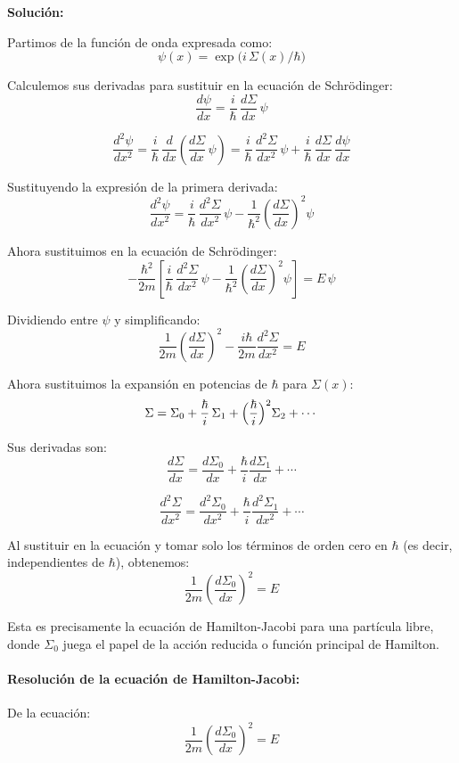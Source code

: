 \documentclass[12pt]{article}
\begin{document}
\begin{enumerate}
  \textbf{Solución:}

  Partimos de la función de onda expresada como:
  \[
    \psi(x) = \exp\!\bigl(i\,\Sigma(x)/\hbar\bigr)
  \]

  Calculemos sus derivadas para sustituir en la ecuación de Schrödinger:
  \[
    \frac{d\psi}{dx} = \frac{i}{\hbar}\,\frac{d\Sigma}{dx}\,\psi
  \]

  \[
    \frac{d^2\psi}{dx^2} = \frac{i}{\hbar}\,\frac{d}{dx}\left(\frac{d\Sigma}{dx}\,\psi\right) 
    = \frac{i}{\hbar}\,\frac{d^2\Sigma}{dx^2}\,\psi + \frac{i}{\hbar}\,\frac{d\Sigma}{dx}\,\frac{d\psi}{dx}
  \]

  Sustituyendo la expresión de la primera derivada:
  \[
    \frac{d^2\psi}{dx^2} = \frac{i}{\hbar}\,\frac{d^2\Sigma}{dx^2}\,\psi - \frac{1}{\hbar^2}\left(\frac{d\Sigma}{dx}\right)^2\psi
  \]

  Ahora sustituimos en la ecuación de Schrödinger:
  \[
    -\frac{\hbar^2}{2m}\left[\frac{i}{\hbar}\,\frac{d^2\Sigma}{dx^2}\,\psi - \frac{1}{\hbar^2}\left(\frac{d\Sigma}{dx}\right)^2\psi\right] = E\,\psi
  \]

  Dividiendo entre $\psi$ y simplificando:
  \[
    \frac{1}{2m}\left(\frac{d\Sigma}{dx}\right)^2 - \frac{i\hbar}{2m}\frac{d^2\Sigma}{dx^2} = E
  \]

  Ahora sustituimos la expansión en potencias de $\hbar$ para $\Sigma(x)$:
  \[
    \Sigma = \Sigma_0 + \frac{\hbar}{i}\,\Sigma_1 + \Bigl(\frac{\hbar}{i}\Bigr)^2 \Sigma_2 + \cdots
  \]

  Sus derivadas son:
  \[
    \frac{d\Sigma}{dx} = \frac{d\Sigma_0}{dx} + \frac{\hbar}{i}\frac{d\Sigma_1}{dx} + \cdots
  \]

  \[
    \frac{d^2\Sigma}{dx^2} = \frac{d^2\Sigma_0}{dx^2} + \frac{\hbar}{i}\frac{d^2\Sigma_1}{dx^2} + \cdots
  \]

  Al sustituir en la ecuación y tomar solo los términos de orden cero en $\hbar$ (es decir, independientes de $\hbar$), obtenemos:
  \[
    \frac{1}{2m}\left(\frac{d\Sigma_0}{dx}\right)^2 = E
  \]

  Esta es precisamente la ecuación de Hamilton-Jacobi para una partícula libre, donde $\Sigma_0$ juega el papel de la acción reducida o función principal de Hamilton.

  \paragraph{Resolución de la ecuación de Hamilton-Jacobi:}

  De la ecuación:
  \[
    \frac{1}{2m}\left(\frac{d\Sigma_0}{dx}\right)^2 = E
  \]


\end{enumerate}
\end{document}
